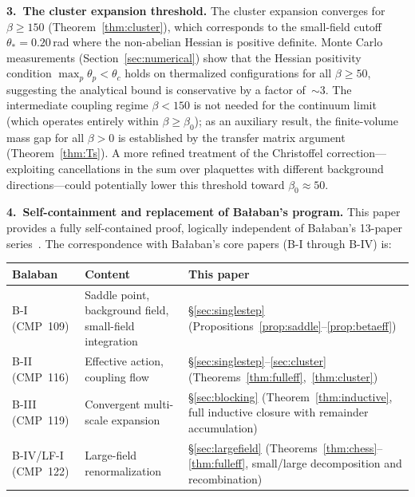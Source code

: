\documentclass[11pt]{article}
\theoremstyle{definition}
\begin{document}
\medskip\noindent\textbf{3.~The cluster expansion threshold.}
The cluster expansion converges for $\beta\ge 150$
(Theorem~\ref{thm:cluster}), which corresponds to the small-field
cutoff $\theta_*=0.20$\,rad where the non-abelian Hessian is
positive definite.  Monte Carlo measurements
(Section~\ref{sec:numerical}) show that the Hessian positivity
condition $\max_p\theta_p<\theta_c$ holds on thermalized
configurations for all $\beta\ge 50$, suggesting the analytical
bound is conservative by a factor of~${\sim}3$.
The intermediate coupling regime
$\beta<150$ is not needed for the continuum limit (which operates
entirely within $\beta\ge\beta_0$); as an auxiliary result,
the finite-volume mass gap for all
$\beta>0$ is established by the transfer matrix argument
(Theorem~\ref{thm:Ts}).  A more refined treatment of the Christoffel
correction---exploiting cancellations in the sum over plaquettes
with different background directions---could potentially lower
this threshold toward $\beta_0\approx 50$.

\medskip\noindent\textbf{4.~Self-containment and replacement of Ba\l aban's program.}
This paper provides a fully self-contained proof, logically independent
of Ba\l aban's 13-paper series~\cite{BalabanI,BalabanII,BalabanIII,BalabanLF1,BalabanLF2}.
The correspondence with Ba\l aban's core papers (B-I through B-IV) is:

\begin{center}
\begin{tabular}{p{3cm}p{4cm}p{5cm}}
\toprule
\textbf{Balaban} & \textbf{Content} & \textbf{This paper}\\
\midrule
B-I (CMP~109) & Saddle point, background field, small-field integration &
\S\ref{sec:singlestep} (Propositions~\ref{prop:saddle}--\ref{prop:betaeff})\\
B-II (CMP~116) & Effective action, coupling flow &
\S\ref{sec:singlestep}--\ref{sec:cluster} (Theorems~\ref{thm:fulleff},~\ref{thm:cluster})\\
B-III (CMP~119) & Convergent multi-scale expansion &
\S\ref{sec:blocking} (Theorem~\ref{thm:inductive}, full inductive
closure with remainder accumulation)\\
B-IV/LF-I (CMP~122) & Large-field renormalization &
\S\ref{sec:largefield} (Theorems~\ref{thm:chess}--\ref{thm:fulleff},
small/large decomposition and recombination)\\
\bottomrule
\end{tabular}
\end{center}
\end{document}
